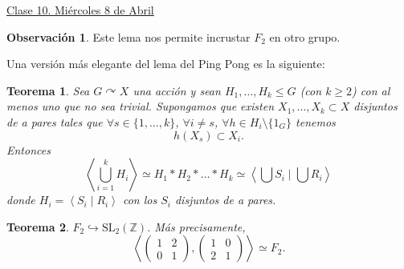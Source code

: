 \documentclass{article}
\newtheorem{theorem}{Teorema}[subsection]
\theoremstyle{definition}
\newtheorem*{obs}{Observación}
\theoremstyle{remark}
\numberwithin{equation}{section}
\newcommand{\Z}{\mathbb{Z}}
\newcommand{\embed}{\hookrightarrow}
\newcommand{\acts}{\curvearrowright}
\newcommand{\SL}{\mathrm{SL}}
\newcommand{\gen}[1]{\left\langle #1 \right\rangle}
\newcommand{\matr}[1]{\begin{pmatrix}#1\end{pmatrix}}
\newcommand{\fecha}[1]{\begin{flushright} \underline{#1} \end{flushright}}
\begin{document}
\fecha{Clase 10. Miércoles 8 de Abril}

\begin{obs}
  Este lema nos permite incrustar $F_2$ en otro grupo.
\end{obs}

Una versión más elegante del lema del Ping Pong es la siguiente:

\begin{theorem}
  Sea $G \acts X$ una acción y sean $H_1,\dots, H_k \leqslant G$ (con $k \geq 2$) con al menos uno que no sea trivial.
  Supongamos que existen $X_1, \dots, X_k \subset X$ disjuntos de a pares tales que $\forall s \in \{1,\dots, k\}$, $\forall i \neq s$, $\forall h \in H_i \setminus \{1_G\}$ tenemos
  \[h(X_s) \subset X_i.\]
  Entonces
  \[\gen{\bigcup_{i=1}^k H_i}
  \simeq H_1 * H_2 * \dots * H_k
  \simeq \gen{\bigcup S_i \mid \bigcup R_i}\]
  donde $H_i = \gen{S_i \mid R_i}$ con los $S_i$ disjuntos de a pares.
\end{theorem}

\begin{theorem}
  $F_2 \embed \SL_2(\Z)$. Más precisamente,
  \[\gen{\matr{1 & 2 \\ 0 & 1}, \matr{1 & 0 \\ 2 & 1}} \simeq F_2.\]
\end{theorem}
\end{document}
